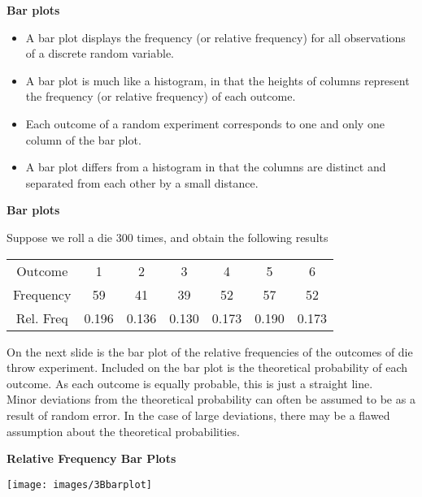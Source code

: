 \documentclass[]{report}
\begin{document}
{
\textbf{Bar plots}

\begin{itemize} \item A bar plot displays the frequency (or relative frequency) for all observations of a discrete random variable. \item A bar plot is much like a histogram, in that the heights of columns represent the frequency (or relative frequency) of each outcome.
\item Each outcome of a random experiment corresponds to one and only one column of the bar plot.
\item A bar plot differs from a histogram in that the columns are distinct and separated from each other by a small distance.
\end{itemize}
}
{
\textbf{Bar plots}

Suppose we roll a die 300 times, and obtain the following results

\begin{center}
\begin{tabular}{|c|c|c|c|c|c|c|}
\hline

Outcome & 1 & 2 & 3 & 4 & 5 & 6 \\
Frequency & 59 &41 &39 &52 &57 &52  \\
Rel. Freq & 0.196 & 0.136 & 0.130 & 0.173 & 0.190 & 0.173\\
\hline
\end{tabular}
\end{center}

On the next slide is the bar plot of the relative frequencies of the outcomes of die throw experiment.
Included on the bar plot is the theoretical probability of each outcome. As each outcome is equally probable, this is just a straight line.\\ \bigskip
Minor deviations from the theoretical probability can often be assumed to be as a result of random error. In the case of large deviations, there may be a flawed assumption about the theoretical probabilities.
}


{
\textbf{Relative Frequency Bar Plots}

\begin{center}
\texttt{[image: images/3Bbarplot]}
\end{center}
}
\end{document}
